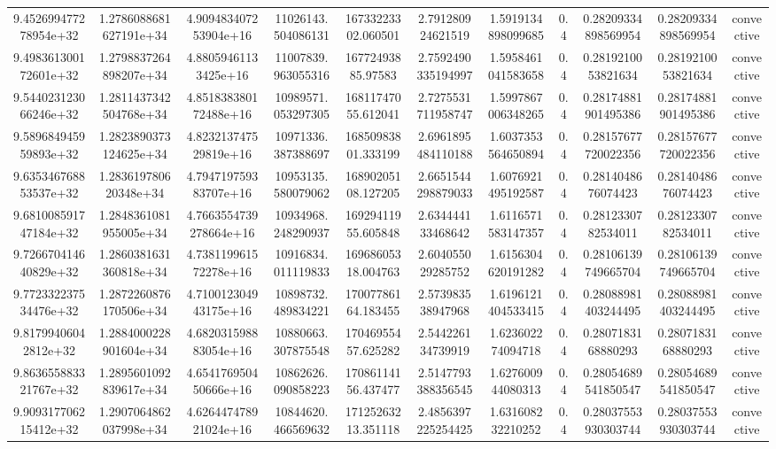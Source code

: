 \begin{table}
\begin{tabular}{ccccccccccc}
9.452699477278954e+32 & 1.2786088681627191e+34 & 4.909483407253904e+16 & 11026143.504086131 & 16733223302.060501 & 2.791280924621519 & 1.5919134898099685 & 0.4 & 0.28209334898569954 & 0.28209334898569954 & convective \\
9.498361300172601e+32 & 1.2798837264898207e+34 & 4.88059461133425e+16 & 11007839.963055316 & 16772493885.97583 & 2.7592490335194997 & 1.5958461041583658 & 0.4 & 0.2819210053821634 & 0.2819210053821634 & convective \\
9.544023123066246e+32 & 1.2811437342504768e+34 & 4.851838380172488e+16 & 10989571.053297305 & 16811747055.612041 & 2.7275531711958747 & 1.5997867006348265 & 0.4 & 0.28174881901495386 & 0.28174881901495386 & convective \\
9.589684945959893e+32 & 1.2823890373124625e+34 & 4.823213747529819e+16 & 10971336.387388697 & 16850983801.333199 & 2.6961895484110188 & 1.6037353564650894 & 0.4 & 0.28157677720022356 & 0.28157677720022356 & convective \\
9.635346768853537e+32 & 1.283619780620348e+34 & 4.794719759383707e+16 & 10953135.580079062 & 16890205108.127205 & 2.6651544298879033 & 1.6076921495192587 & 0.4 & 0.2814048676074423 & 0.2814048676074423 & convective \\
9.681008591747184e+32 & 1.2848361081955005e+34 & 4.7663554739278664e+16 & 10934968.248290937 & 16929411955.605848 & 2.634444133468642 & 1.6116571583147357 & 0.4 & 0.2812330782534011 & 0.2812330782534011 & convective \\
9.726670414640829e+32 & 1.2860381631360818e+34 & 4.738119961572278e+16 & 10916834.011119833 & 16968605318.004763 & 2.604055029285752 & 1.6156304620191282 & 0.4 & 0.28106139749665704 & 0.28106139749665704 & convective \\
9.772332237534476e+32 & 1.2872260876170506e+34 & 4.710012304943175e+16 & 10898732.489834221 & 17007786164.183455 & 2.573983538947968 & 1.6196121404533415 & 0.4 & 0.28088981403244495 & 0.28088981403244495 & convective \\
9.81799406042812e+32 & 1.2884000228901604e+34 & 4.682031598883054e+16 & 10880663.307875548 & 17046955457.625282 & 2.544226134739919 & 1.623602274094718 & 0.4 & 0.2807183168880293 & 0.2807183168880293 & convective \\
9.863655883321767e+32 & 1.2895601092839617e+34 & 4.654176950450666e+16 & 10862626.090858223 & 17086114156.437477 & 2.5147793388356545 & 1.627600944080313 & 0.4 & 0.28054689541850547 & 0.28054689541850547 & convective \\
9.909317706215412e+32 & 1.2907064862037998e+34 & 4.626447478921024e+16 & 10844620.466569632 & 17125263213.351118 & 2.4856397225254425 & 1.631608232210252 & 0.4 & 0.28037553930303744 & 0.28037553930303744 & convective \\

\end{tabular}
\end{table}
